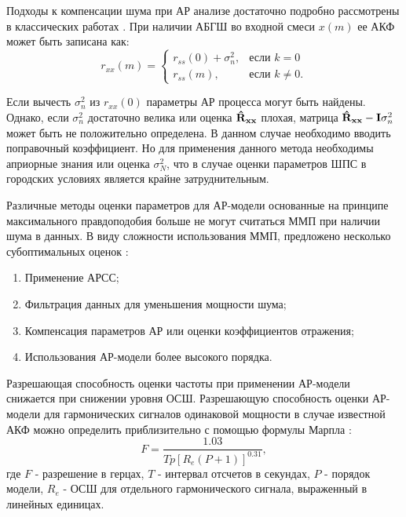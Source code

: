 Подходы к компенсации шума при АР анализе достаточно подробно рассмотрены в классических работах \cite{kay_ar_book, kay_noise_compensation}.
При наличии АБГШ во входной смеси ${x(m)}$ ее АКФ может быть записана как:
\begin{equation}
	\label{eq:acf_noise_basic}
	r_{xx}(m) =	\begin{cases}
				r_{ss}(0) + \sigma_n^2, & \mbox{если } k=0 \\
				r_{ss}(m), & \mbox{если } k \ne 0.
			\end{cases}
\end{equation}

Если вычесть ${\sigma_n^2}$ из ${r_{xx}(0)}$ параметры АР процесса могут быть найдены. Однако, если ${\sigma_n^2}$ достаточно велика или 
оценка ${{\bf{\hat{R}_{xx}}}}$ плохая, матрица ${{\bf{\hat{R}_{xx}}} - {\bf{I}}\sigma_n^2}$ может быть не положительно определена. В данном
случае необходимо вводить поправочный коэффициент. Но для применения данного метода необходимы априорные знания или оценка ${\sigma_N^2}$,
что в случае оценки параметров ШПС в городских условиях является крайне затруднительным.

Различные методы оценки параметров для АР-модели основанные на принципе максимального правдоподобия больше не
могут считаться ММП при наличии шума в данных. В виду сложности использования ММП, предложено несколько 
субоптимальных оценок \cite{marpl_book, kay_ar_book}:
\begin{enumerate}
	\item Применение АРСС;
	\item Фильтрация данных для уменьшения мощности шума;
	\item Компенсация параметров АР или оценки коэффициентов отражения;
	\item Использования АР-модели более высокого порядка.
\end{enumerate}

Разрешающая способность оценки частоты при применении АР-модели снижается при снижении уровня ОСШ. Разрешающую способность оценки АР-модели для гармонических сигналов
одинаковой мощности в случае известной АКФ можно определить приблизительно с помощью формулы Марпла \cite{marpl_book, kay_ar_book}:
\begin{equation}
	\label{eq:lpc_est_quality_1}
	F = \frac{1.03}{Tp[R_e(P+1)]^{0.31}},
\end{equation}
где ${F}$ - разрешение в герцах, ${T}$ - интервал отсчетов в секундах, ${P}$ - порядок модели, ${R_e}$ - ОСШ для отдельного гармонического сигнала, выраженный в линейных единицах.

